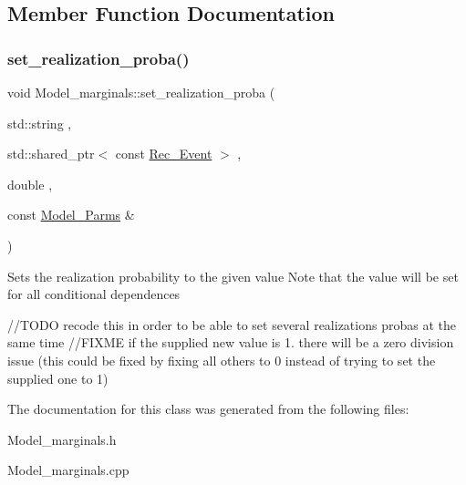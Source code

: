 \subsection{Member Function Documentation}
\mbox{\label{classModel__marginals_a44da8b738a7dd0f2a7d0d85176b17728}} 
\subsubsection{\texorpdfstring{set\+\_\+realization\+\_\+proba()}{set\_realization\_proba()}}
{\footnotesize\ttfamily void Model\+\_\+marginals\+::set\+\_\+realization\+\_\+proba (\begin{DoxyParamCaption}\item[{std\+::string}]{,  }\item[{std\+::shared\+\_\+ptr$<$ const \hyperlink{classRec__Event}{Rec\+\_\+\+Event} $>$}]{,  }\item[{double}]{,  }\item[{const \hyperlink{classModel__Parms}{Model\+\_\+\+Parms} \&}]{ }\end{DoxyParamCaption})}

Sets the realization probability to the given value Note that the value will be set for all conditional dependences

//\+T\+O\+DO recode this in order to be able to set several realizations probas at the same time //\+F\+I\+X\+ME if the supplied new value is 1. there will be a zero division issue (this could be fixed by fixing all others to 0 instead of trying to set the supplied one to 1) 

The documentation for this class was generated from the following files\+:\begin{DoxyCompactItemize}
\item 
Model\+\_\+marginals.\+h\item 
Model\+\_\+marginals.\+cpp\end{DoxyCompactItemize}

